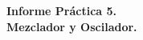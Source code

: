 \documentclass[a4paper]{article}
\begin{document}
\newpage
\begin{center}
    \Large \textbf{Informe Práctica 5.\\ Mezclador y Oscilador.}
\end{center}


%
%
%
%



\end{document}
